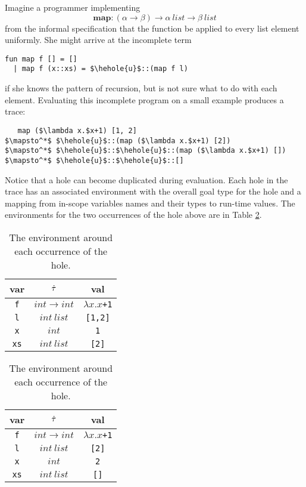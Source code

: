 Imagine a programmer implementing $$\mathbf{map} : (\alpha \to \beta) \to
\alpha ~\mathit{list} \to \beta ~\mathit{list}$$ from the informal
specification that the function be applied to every list element uniformly.
She might arrive at the incomplete term
\begin{lstlisting}
fun map f [] = []
  | map f (x::xs) = $\hehole{u}$::(map f l)
\end{lstlisting}
if she knows the pattern of recursion, but is not sure what to do with each
element. Evaluating this incomplete program on a small example produces a
trace:
\begin{lstlisting}
   map ($\lambda x.$x+1) [1, 2]
$\mapsto^*$ $\hehole{u}$::(map ($\lambda x.$x+1) [2])
$\mapsto^*$ $\hehole{u}$::$\hehole{u}$::(map ($\lambda x.$x+1) [])
$\mapsto^*$ $\hehole{u}$::$\hehole{u}$::[]
\end{lstlisting}
Notice that a hole can become duplicated during evaluation. Each hole in the trace has an associated environment with the overall goal
type for the hole and a mapping from in-scope variables names and their
types to run-time values. The environments for the two occurrences of the hole above are
in Table \ref{tabx}.

\begin{table}[h!]
  \begin{subtable}{.5\linewidth}
    \caption{hole type: $\beta=\texttt{int}$}
    \centering
        {
          \footnotesize
          \begin{tabular}{c|c|c}
            var & $\dot{\tau}$ & val\\
            \hline
            \texttt{f} & $int \to int$ & $\lambda x.x$\texttt{+1}\\
            \texttt{l} & $int ~list$ & \texttt{[1,2]}\\
            \texttt{x} & $int$ & \texttt{1}\\
            \texttt{xs} & $int ~list$ & \texttt{[2]}\\
          \end{tabular}
        }
  \end{subtable}%
  \begin{subtable}{.5\linewidth}
    \caption{hole type: $\beta=\texttt{int}$}
    \centering
        {
          \footnotesize
          \begin{tabular}{c|c|c}
            var & $\dot{\tau}$ & val\\
            \hline
            \texttt{f} & $int \to int$ & $\lambda x.x$\texttt{+1}\\
            \texttt{l} & $int ~list$ & \texttt{[2]}\\
            \texttt{x} & $int$ & \texttt{2}\\
            \texttt{xs} & $int ~list$ & \texttt{[]}\\
          \end{tabular}
        }
  \end{subtable}
  \caption{The environment around each occurrence of the hole.}
  \label{tabx}
\end{table}

